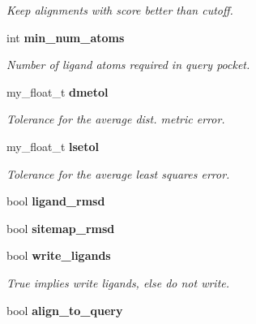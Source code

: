 \begin{CompactItemize}
\begin{CompactList}\small\item\em Keep alignments with score better than cutoff. \item\end{CompactList}\item 
int \bf{min\_\-num\_\-atoms}\label{classASCbase_1_1SearchParameters_b82481de1a76a7e1ef2701225f4e8e2b}

\begin{CompactList}\small\item\em Number of ligand atoms required in query pocket. \item\end{CompactList}\item 
my\_\-float\_\-t \bf{dmetol}\label{classASCbase_1_1SearchParameters_9afa8f1e64a425ad8e45aaf7402029c7}

\begin{CompactList}\small\item\em Tolerance for the average dist. metric error. \item\end{CompactList}\item 
my\_\-float\_\-t \bf{lsetol}\label{classASCbase_1_1SearchParameters_fd82cd2d31ed05774d10ab78235133f6}

\begin{CompactList}\small\item\em Tolerance for the average least squares error. \item\end{CompactList}\item 
bool \textbf{ligand\_\-rmsd}\label{classASCbase_1_1SearchParameters_922b10578a528a00d7b98686005636fe}

\item 
bool \textbf{sitemap\_\-rmsd}\label{classASCbase_1_1SearchParameters_bfcbc6418735f08eb7d0f7bd11d12a62}

\item 
bool \bf{write\_\-ligands}\label{classASCbase_1_1SearchParameters_8f581cefd00526d81c5db9e7f2e53dd7}

\begin{CompactList}\small\item\em True implies write ligands, else do not write. \item\end{CompactList}\item 
bool \bf{align\_\-to\_\-query}\label{classASCbase_1_1SearchParameters_1cb575b033f4db440a377d4ea8332929}


\end{CompactItemize}
